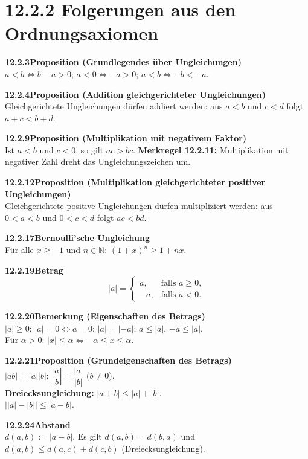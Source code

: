 \documentclass[a4paper,12pt]{article}
\newcommand{\gentry}[3]{%
  \noindent\textbf{#1\quad #2}\nopagebreak\\[0.2em]
  #3\par\smallskip
}
\begin{document}
\section*{12.2.2 \quad Folgerungen aus den Ordnungsaxiomen}

\gentry{12.2.3}{Proposition (Grundlegendes über Ungleichungen)}{%
  $a < b \Leftrightarrow b - a > 0$; \quad $a < 0 \Leftrightarrow -a > 0$; \quad
  $a < b \Leftrightarrow -b < -a$.
}

\gentry{12.2.4}{Proposition (Addition gleichgerichteter Ungleichungen)}{%
  Gleichgerichtete Ungleichungen dürfen addiert werden:
  aus $a < b$ und $c < d$ folgt $a + c < b + d$.
}

\gentry{12.2.9}{Proposition (Multiplikation mit negativem Faktor)}{%
  Ist $a < b$ und $c < 0$, so gilt $ac > bc$.
  \textbf{Merkregel 12.2.11:} Multiplikation mit negativer Zahl dreht das Ungleichungszeichen um.
}

\gentry{12.2.12}{Proposition (Multiplikation gleichgerichteter positiver Ungleichungen)}{%
  Gleichgerichtete positive Ungleichungen dürfen multipliziert werden:
  aus $0 < a < b$ und $0 < c < d$ folgt $ac < bd$.
}

\gentry{12.2.17}{Bernoulli'sche Ungleichung}{%
  Für alle $x \geq -1$ und $n \in \mathbb{N}$: $(1+x)^n \geq 1 + nx$.
}

\gentry{12.2.19}{Betrag}{%
  \[
    |a| = \begin{cases} a, & \text{falls } a \geq 0, \\ -a, & \text{falls } a < 0. \end{cases}
  \]
}

\gentry{12.2.20}{Bemerkung (Eigenschaften des Betrags)}{%
  $|a| \geq 0$; \quad $|a| = 0 \Leftrightarrow a = 0$; \quad $|a| = |-a|$; \quad
  $a \leq |a|$, $-a \leq |a|$.\\
  Für $\alpha > 0$: $|x| \leq \alpha \Leftrightarrow -\alpha \leq x \leq \alpha$.
}

\gentry{12.2.21}{Proposition (Grundeigenschaften des Betrags)}{%
  $|ab| = |a||b|$; \quad $\left|\dfrac{a}{b}\right| = \dfrac{|a|}{|b|}$ ($b \neq 0$).\\
  \textbf{Dreiecksungleichung:} $|a+b| \leq |a| + |b|$.\\
  $\bigl||a|-|b|\bigr| \leq |a-b|$.
}

\gentry{12.2.24}{Abstand}{%
  $d(a,b) := |a-b|$. Es gilt $d(a,b) = d(b,a)$ und
  $d(a,b) \leq d(a,c) + d(c,b)$ (Dreiecksungleichung).
}
\end{document}
